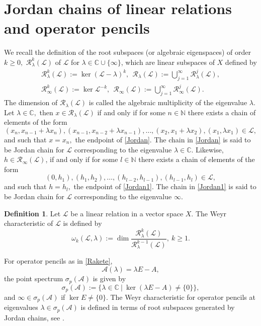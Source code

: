 \documentclass{birkjour}
\theoremstyle{definition}
\newtheorem{defn}[thm]{Definition}
\theoremstyle{remark}
\numberwithin{equation}{section}
\newcommand{\C}{\mathbb C}
\newcommand{\N}{\mathbb N}
\newcommand{\A}{\mathcal A}
\newcommand{\Rr}{\mathcal R}
\newcommand{\Ll}{\mathcal L}
\renewcommand{\geq}{\geqslant}
\begin{document}
\section{Jordan chains of linear relations and operator pencils}
We recall the definition of the root subspaces (or algebraic eigenspaces) of order $k\geq 0,$  $\Rr_{\lambda}^k(\Ll)$ of $\Ll$ for $\lambda\in \C\cup\{\infty\}$, which are linear subspaces of $X$ defined by
\begin{equation*}
\begin{aligned}
\Rr_{\lambda}^ k(\Ll):= \ker (\Ll-\lambda)^k, \  \ \Rr_{\lambda}(\Ll):= \bigcup _{j=1} ^{\infty} \Rr_{\lambda}^ j(\Ll), \\
\Rr_{\infty}^ k(\Ll):= \ker \Ll^{-k}, \  \ \Rr_{\infty}(\Ll):= \bigcup _{j=1} ^{\infty} \Rr_{\infty}^ j(\Ll).
\end{aligned}
\end{equation*}
The dimension of $\Rr_{\lambda}(\Ll)$ is called the algebraic multiplicity of the eigenvalue $\lambda.$ Let $\lambda \in \C,$ then $x\in \Rr_{\lambda}(\Ll)$ if and only if for some $n\in \N$ there exists a chain of elements of the form 
\begin{equation}\label{Jordan}
 (x_n,x_{n-1}+\lambda x_n), (x_{n-1},x_{n-2}+\lambda x_{n-1}), \ldots, (x_2,x_1+\lambda x_2), (x_1, \lambda x_1) \in \Ll, \end{equation} and such that $x=x_n,$ the endpoint of \eqref{Jordan}. The chain in \eqref{Jordan} is said to be Jordan chain for $\Ll$ corresponding to the eigenvalue $\lambda \in \C$. Likewise, $h\in \Rr_{\infty}(\Ll) $, if and only if for some $l\in \N$ there exists a chain of elements of the form \begin{equation}\label{Jordan1}
 (0,h_1), (h_1,h_2), \ldots, (h_{l-2},h_{l-1}), (h_{l-1}, h_l) \in \Ll, \end{equation} and such that $h=h_l,$ the endpoint of \eqref{Jordan1}. The chain in \eqref{Jordan1} is said to be Jordan chain for $\Ll$ corresponding to the eigenvalue $\infty.$
\begin{defn}
     Let $\Ll$ be a linear relation in a vector space $X$. The Weyr characteristic of $\Ll$ is defined by
$$\omega_k(\Ll,\lambda):= \dim \frac{\Rr_{\lambda}^ k(\Ll)}{\Rr_{\lambda}^ {k-1}(\Ll)}, \ k\geq1.$$ 
\end{defn}

For operator pencils  as in \eqref{Rakete},
$$
\A(\lambda)= \lambda E-A, 
$$
the point spectrum $\sigma_p(\A)$ is given by 
\begin{equation*}
	\sigma_p(\A):=\{\lambda\in\C~|~ \ker(\lambda E-A)\neq\{0\}\},
\end{equation*}
and $\infty\in\sigma_p(\A)$ if $\ker E \neq \{0\}$.
The Weyr characteristic for operator pencils at eigenvalues $\lambda \in \sigma_p(\A)$ is defined in terms of root subspaces generated by Jordan chains, see \cite{K51, M88}.
\end{document}

